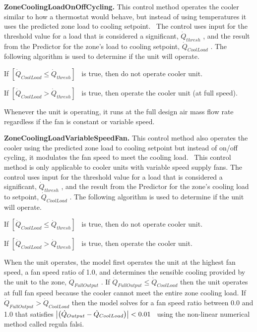 \textbf{ZoneCoolingLoadOnOffCycling.} This control method operates the cooler similar to how a thermostat would behave, but instead of using temperatures it uses the predicted zone load to cooling setpoint.~ The control uses input for the threshold value for a load that is considered a significant, \({\dot Q_{thresh}}\) , and the result from the Predictor for the zone's load to cooling setpoint, \({\dot Q_{CoolLoad}}\) . The following algorithm is used to determine if the unit will operate.

If \(\left[ {{{\dot Q}_{CoolLoad}} \le {{\dot Q}_{thresh}}} \right]\) ~is true, then do not operate cooler unit.

If \(\left[ {{{\dot Q}_{CoolLoad}} > {{\dot Q}_{thresh}}} \right]\) ~is true, then operate the cooler unit (at full speed).

Whenever the unit is operating, it runs at the full design air mass flow rate regardless if the fan is constant or variable speed.

\textbf{ZoneCoolingLoadVariableSpeedFan.} This control method also operates the cooler using the predicted zone load to cooling setpoint but instead of on/off cycling, it modulates the fan speed to meet the cooling load.~ This control method is only applicable to cooler units with variable speed supply fans. The control uses input for the threshold value for a load that is considered a significant, \({\dot Q_{thresh}}\) , and the result from the Predictor for the zone's cooling load to setpoint, \({\dot Q_{CoolLoad}}\) . The following algorithm is used to determine if the unit will operate.

If \(\left[ {{{\dot Q}_{CoolLoad}} \le {{\dot Q}_{thresh}}} \right]\) ~is true, then do not operate cooler unit.

If \(\left[ {{{\dot Q}_{CoolLoad}} > {{\dot Q}_{thresh}}} \right]\) ~is true, then operate the cooler unit.

When the unit operates, the model first operates the unit at the highest fan speed, a fan speed ratio of 1.0, and determines the sensible cooling provided by the unit to the zone, $\dot{Q}_{FullOutput}$ . If $\dot{Q}_{FullOutput} \leq \dot Q_{CoolLoad}$ then the unit operates at full fan speed because the cooler cannot meet the entire zone cooling load. If $\dot{Q}_{FullOutput} > \dot{Q}_{CoolLoad}$ then the model solves for a fan speed ratio between 0.0 and 1.0 that satisfies $\left|\PB{\dot{Q}_{Output}-\dot{Q}_{CoolLoad}}\right| < 0.01$ ~using the non-linear numerical method called regula falsi.

